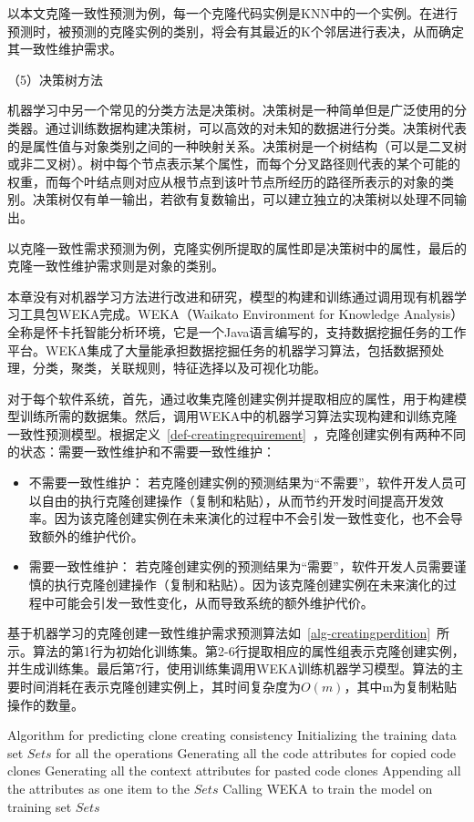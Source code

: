 以本文克隆一致性预测为例，每一个克隆代码实例是KNN中的一个实例。在进行预测时，被预测的克隆实例的类别，将会有其最近的K个邻居进行表决，从而确定其一致性维护需求。

（5）决策树方法

机器学习中另一个常见的分类方法是决策树。决策树是一种简单但是广泛使用的分类器。通过训练数据构建决策树，可以高效的对未知的数据进行分类。决策树代表的是属性值与对象类别之间的一种映射关系。决策树是一个树结构（可以是二叉树或非二叉树）。树中每个节点表示某个属性，而每个分叉路径则代表的某个可能的权重，而每个叶结点则对应从根节点到该叶节点所经历的路径所表示的对象的类别。决策树仅有单一输出，若欲有复数输出，可以建立独立的决策树以处理不同输出。

以克隆一致性需求预测为例，克隆实例所提取的属性即是决策树中的属性，最后的克隆一致性维护需求则是对象的类别。

本章没有对机器学习方法进行改进和研究，模型的构建和训练通过调用现有机器学习工具包WEKA完成。WEKA（Waikato Environment for Knowledge Analysis）全称是怀卡托智能分析环境，它是一个Java语言编写的，支持数据挖掘任务的工作平台。WEKA集成了大量能承担数据挖掘任务的机器学习算法，包括数据预处理，分类，聚类，关联规则，特征选择以及可视化功能。

对于每个软件系统，首先，通过收集克隆创建实例并提取相应的属性，用于构建模型训练所需的数据集。然后，调用WEKA中的机器学习算法实现构建和训练克隆一致性预测模型。根据定义~\ref{def-creatingrequirement}~，克隆创建实例有两种不同的状态：需要一致性维护和不需要一致性维护：
\begin{itemize}
\item 
不需要一致性维护：
若克隆创建实例的预测结果为“不需要”，软件开发人员可以自由的执行克隆创建操作（复制和粘贴），从而节约开发时间提高开发效率。因为该克隆创建实例在未来演化的过程中不会引发一致性变化，也不会导致额外的维护代价。
\item
需要一致性维护：
若克隆创建实例的预测结果为“需要”，软件开发人员需要谨慎的执行克隆创建操作（复制和粘贴）。因为该克隆创建实例在未来演化的过程中可能会引发一致性变化，从而导致系统的额外维护代价。
\end{itemize}

基于机器学习的克隆创建一致性维护需求预测算法如~\ref{alg-creatingperdition}~所示。算法的第1行为初始化训练集。第2-6行提取相应的属性组表示克隆创建实例，并生成训练集。最后第7行，使用训练集调用WEKA训练机器学习模型。算法的主要时间消耗在表示克隆创建实例上，其时间复杂度为$O(m)$，其中m为复制粘贴操作的数量。

\begin{minipage}{0.8\textwidth}
\centering
\begin{algorithm}[H]
 {Algorithm for predicting clone creating consistency}
\label{alg-creatingperdition}
Initializing the training data set $Sets$ for all the operations\; 
{ 
Generating all the code attributes for copied code clones\;
Generating all the context attributes for pasted code clones\;
Appending all the attributes as one item to the $Sets$\;
}
Calling WEKA to train the model on training set $Sets$\;
\end{algorithm}
\end{minipage}

